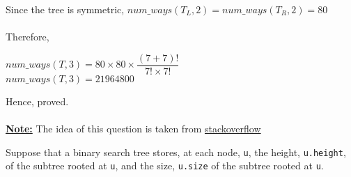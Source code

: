 \documentclass[addpoints]{exam}
\begin{document}
\begin{questions}
\begin{solution}
  	Since the tree is symmetric, $num\_ways(T_L, 2) = num\_ways(T_R, 2) = 80$\\ \\
  	Therefore, 
  	\begin{center}
  		$num\_ways(T, 3) = 80 \times 80 \times \dfrac{(7+7)!}{7! \times 7!}$\\
  		$num\_ways(T, 3) = 21964800$
	\end{center}  	  
  	Hence, proved.
  	\\ \\
  	\textbf{\underline{Note:}} The idea of this question is taken from \href{https://stackoverflow.com/questions/17119116/how-many-ways-can-you-insert-a-series-of-values-into-a-bst-to-form-a-specific-tr}{stackoverflow}
  \end{solution}
\pagebreak

  Suppose that a binary search tree stores, at each node, {\tt u}, the height, {\tt u.height}, of the subtree rooted at {\tt u}, and the size, {\tt u.size} of the subtree rooted at {\tt u}.
  \begin{parts}

\end{parts}
\end{questions}
\end{document}
